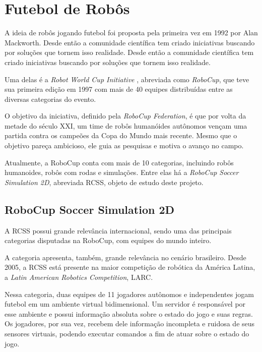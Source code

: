 \section{Futebol de Robôs}
\par A ideia de robôs jogando futebol foi proposta pela primeira vez em 1992 por Alan Mackworth\cite{mackworth1993seeing}. Desde então a comunidade científica tem criado iniciativas buscando por soluções que tornem isso realidade. Desde então a comunidade científica tem criado iniciativas buscando por soluções que tornem isso realidade.
\par Uma delas é a \textit{Robot World Cup Initiative} \cite{robocup-initiative}, abreviada como \textit{RoboCup}, que teve sua primeira edição em 1997 com mais de 40 equipes distribuídas entre as diversas categorias do evento.
\par O objetivo da iniciativa, definido pela \textit{RoboCup Federation}, é que por volta da metade do século XXI, um time de robôs humanóides autônomos vençam uma partida contra os campeões da Copa do Mundo mais recente. Mesmo que o objetivo pareça ambicioso, ele guia as pesquisas e motiva o avanço no campo.
\par Atualmente, a RoboCup conta com mais de 10 categorias, incluindo robôs humanoides, robôs com rodas e simulações. Entre elas há a \textit{RoboCup Soccer Simulation 2D}, abreviada RCSS, objeto de estudo deste projeto.

\subsection{RoboCup Soccer Simulation 2D}
\par A RCSS possui grande relevância internacional, sendo uma das principais categorias disputadas na RoboCup, com equipes do mundo inteiro.
\par A categoria apresenta, também, grande relevância no cenário brasileiro.
Desde 2005, a RCSS está presente na maior competição de robótica da América Latina, a \textit{Latin American Robotics Competition}, LARC.
\par Nessa categoria, duas equipes de 11 jogadores autônomos e independentes jogam futebol em um ambiente virtual bidimensional. Um servidor é responsável por esse ambiente e possui informação absoluta sobre o estado do jogo e suas regras. Os jogadores, por sua vez, recebem dele informação incompleta e ruidosa de seus sensores virtuais, podendo executar comandos a fim de atuar sobre o estado do jogo. \cite{rcssmanual2003}

